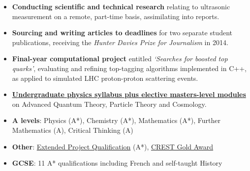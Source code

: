 \documentclass[10pt,a4paper]{cv_template}
\begin{document}
\begin{paracol}{2}

\begin{itemize}
  \item \textbf{Conducting scientific and technical research} relating to ultrasonic measurement on a remote, part-time basis, assimilating into reports.
\end{itemize}
\divider

\begin{itemize}
  \item \textbf{Sourcing and writing articles to deadlines} for two separate student publications, receiving the \textit{Hunter Davies Prize for Journalism} in 2014.
\end{itemize}



\begin{itemize}
  \item \textbf{Final-year computational project} entitled \textit{`Searches for
boosted top quarks'}, evaluating and refining top-tagging algorithms implemented in C++, as applied to simulated LHC proton-proton scattering events.
  \item \textbf{\href{https://www.dur.ac.uk/physics/modules/}{Undergraduate physics syllabus plus elective masters-level modules}} on Advanced Quantum Theory, Particle Theory and Cosmology.
\end{itemize}
\divider

\begin{itemize}
  \item \textbf{A levels}: Physics (A*), Chemistry (A*), Mathematics (A*), Further Mathematics (A), Critical Thinking (A)
  \item \textbf{Other}: \href{https://qips.ucas.com/qip/extended-project-qualification-epq}{Extended Project Qualification} (A*), \href{https://www.crestawards.org/crest-gold}{CREST Gold Award}
  \item \textbf{GCSE}: 11 A* qualifications including French and self-taught History
\end{itemize}


\end{paracol}
\end{document}
